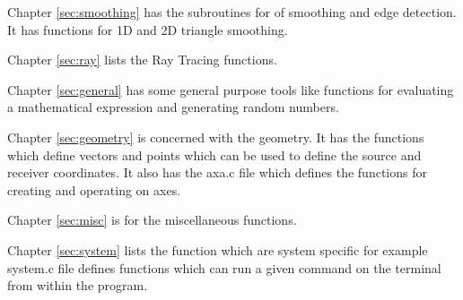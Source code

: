 Chapter \ref{sec:smoothing} has the subroutines for of smoothing and edge detection. It has functions for 1D and 2D triangle smoothing. 
 
Chapter \ref{sec:ray} lists the Ray Tracing functions. 
 
Chapter \ref{sec:general} has some general purpose tools like functions for evaluating a mathematical expression and generating random numbers.
 
Chapter \ref{sec:geometry} is concerned with the geometry. It has the functions which define vectors and points which can be used to define the source and receiver coordinates. It also has the axa.c file which defines the functions for creating and operating on axes.
 
Chapter \ref{sec:misc} is for the miscellaneous functions.
 
Chapter \ref{sec:system} lists the function which are system specific for example system.c file defines functions which can run a given command on the terminal from within the program. 
 